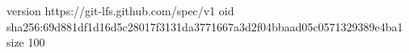 version https://git-lfs.github.com/spec/v1
oid sha256:69d881df1d16d5c28017f3131da3771667a3d2f04bbaad05c0571329389e4ba1
size 100
